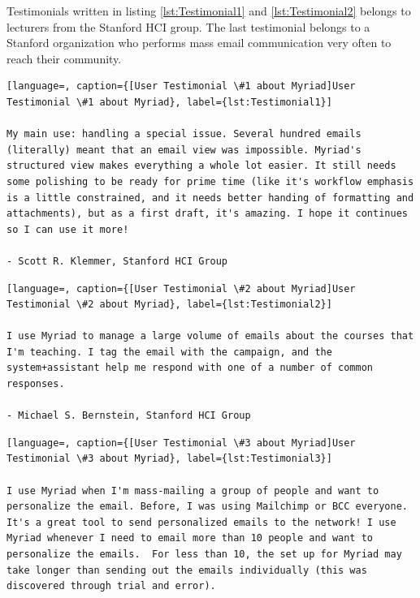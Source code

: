 Testimonials written in listing \ref{lst:Testimonial1} and \ref{lst:Testimonial2} belongs to lecturers from the Stanford \ac{HCI} group. The last testimonial belongs to a Stanford organization who performs mass email communication very often to reach their community.

\vspace{1cm}

\clearpage


\begin{lstlisting}[language=, caption={[User Testimonial \#1 about Myriad]User Testimonial \#1 about Myriad}, label={lst:Testimonial1}]

My main use: handling a special issue. Several hundred emails (literally) meant that an email view was impossible. Myriad's structured view makes everything a whole lot easier. It still needs some polishing to be ready for prime time (like it's workflow emphasis is a little constrained, and it needs better handing of formatting and attachments), but as a first draft, it's amazing. I hope it continues so I can use it more!

- Scott R. Klemmer, Stanford HCI Group
\end{lstlisting}

\vspace{1cm}

\begin{lstlisting}[language=, caption={[User Testimonial \#2 about Myriad]User Testimonial \#2 about Myriad}, label={lst:Testimonial2}]

I use Myriad to manage a large volume of emails about the courses that I'm teaching. I tag the email with the campaign, and the system+assistant help me respond with one of a number of common responses.

- Michael S. Bernstein, Stanford HCI Group
\end{lstlisting}

\vspace{1cm}

\begin{lstlisting}[language=, caption={[User Testimonial \#3 about Myriad]User Testimonial \#3 about Myriad}, label={lst:Testimonial3}]

I use Myriad when I'm mass-mailing a group of people and want to personalize the email. Before, I was using Mailchimp or BCC everyone. It's a great tool to send personalized emails to the network! I use Myriad whenever I need to email more than 10 people and want to personalize the emails.  For less than 10, the set up for Myriad may take longer than sending out the emails individually (this was discovered through trial and error).
\end{lstlisting}

